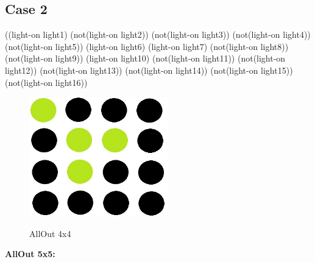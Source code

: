 \newline\newline
\newline
 \subsection{Case 2}
 \newline
 \newline
((light-on light1)  
(not(light-on light2))  
(not(light-on light3))  
(not(light-on light4))
\newline
(not(light-on light5))  
(light-on light6)  
(light-on light7)  
(not(light-on light8))
\newline
(not(light-on light9))  
(light-on light10) 
(not(light-on light11)) 
(not(light-on light12))
\newline
(not(light-on light13)) 
(not(light-on light14)) 
(not(light-on light15)) 
(not(light-on light16))
\newline
\begin{figure}[h]
\centering
\includegraphics[width=6cm]{text/images/pic2.jpeg}\\
\newline
\caption{AllOut 4x4}
\end{figure} \newline \newline

\pagebreak

\textbf{AllOut 5x5:}\newline\newline
\inputminted[linenos]{python}{code/all-out-p01.pddl}
\pagebreak

